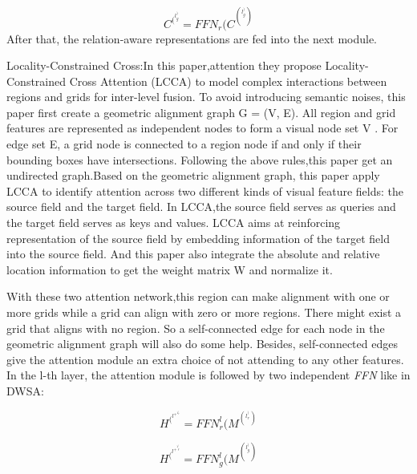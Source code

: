 \documentclass[xelatex,a4j,10pt,twocolumn]{article}
\begin{document}
\begin{equation}
    C^(^l^) _g = FFN_r( C^(^l^) _g)
\end{equation}
After that, the relation-aware representations are fed into the
next module.

Locality-Constrained Cross:In this paper,attention they propose Locality-Constrained Cross Attention (LCCA) to model complex interactions between regions and grids for inter-level fusion. To avoid introducing semantic noises, this paper first create a geometric alignment graph G = (V, E). All region and grid features are represented as independent nodes to form a visual node set V . For edge set E, a grid node is connected to a region node if and only if their bounding boxes have intersections. Following the above rules,this paper get an undirected graph.Based on the geometric alignment graph, this paper apply LCCA to identify attention across two different kinds of visual feature fields: the source field and the target field. In LCCA,the source field serves as queries and the target field serves as keys and values. LCCA aims at reinforcing representation of the source field by embedding information of the target field into the source field. And this paper also integrate the absolute and relative location information to get the weight matrix W and normalize it.

With these two attention network,this region can make alignment with one or more grids while a
grid can align with zero or more regions. There might exist a grid that aligns with no region. So a self-connected edge for each node in the geometric alignment graph will also do some help. Besides, self-connected edges give the attention module an extra choice of not attending to any other features. In the l-th layer, the attention module is followed by two independent \textit{FFN} like in DWSA:

\begin{equation}
    H^(^l^+^1^) _r = FFN_r ^l( M^(^l^) _r)
\end{equation}

\begin{equation}
    H^(^l^+^1^) _g = FFN_g ^l( M^(^l^) _g)
\end{equation}
\end{document}
